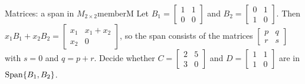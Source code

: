 \documentclass[11pt]{article}
\begin{document}
\begin{exmp}{Matrices: a span in $M_{2\times2}$}{memberM}
Let $B_1=\begin{bmatrix}1&1\\0&0\end{bmatrix}$ and $B_2=\begin{bmatrix}0&1\\1&0\end{bmatrix}$. Then $x_1B_1+x_2B_2=\begin{bmatrix}x_1&x_1+x_2\\x_2&0\end{bmatrix}$, so the span consists of the matrices $\begin{bmatrix}p&q\\r&s\end{bmatrix}$ with $s=0$ and $q=p+r$. Decide whether $C=\begin{bmatrix}2&5\\3&0\end{bmatrix}$ and $D=\begin{bmatrix}1&1\\1&0\end{bmatrix}$ are in $\operatorname{Span}\{B_1,B_2\}$.


\end{exmp}
\end{document}
